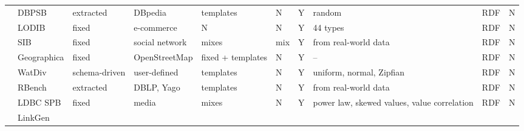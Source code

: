 \begin{sidewaystable}
{\begin{tabular}{| c | p{2.2cm} | p{2cm} |  p{2.2cm} | l |  l | l | p{3cm} | p{1.4cm} | l | }
 & DBPSB & extracted & DBpedia &  templates & N & Y & random &  RDF & N   \\
\cline{2-10}
 & LODIB & fixed & e-commerce &  N & N & Y & 44 types &  RDF & N   \\
\cline{2-10}
 & SIB & fixed & social network &  mixes & mix & Y & from real-world data &  RDF & N   \\
\cline{2-10}
 & Geographica & fixed & OpenStreetMap  & fixed + templates  & N & Y & -- &  RDF & N   \\
\cline{2-10}
 & WatDiv & schema-driven & user-defined  & templates & N & Y & uniform, normal, Zipfian &  RDF & N   \\
\cline{2-10}
 & RBench & extracted & DBLP, Yago  & templates & N & Y & from real-world data &  RDF & N  \\
\cline{2-10}
 & LDBC SPB & fixed & media  & mixes & N & Y & power law, skewed values, value correlation &  RDF & N  \\
\cline{2-10}
 & LinkGen & & & & & & & & \\
\hline
\end{tabular} }
\label{tab:comparisonCharacteristicsA}
\end{sidewaystable}

